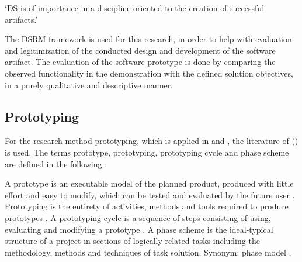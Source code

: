 \enquote*{DS is of importance in a discipline oriented to the creation of successful artifacts.}
\autocite{designScienceResearchMethodologyForInformationSystemsResearch}



The DSRM framework is used for this research,
in order to help with evaluation and legitimization
of the conducted design and development of the software artifact.
The evaluation of the software prototype is done by
comparing the observed functionality in the demonstration
with the defined solution objectives,
in a purely qualitative and descriptive manner.







\subsection{Prototyping}
\label{methodology:prototyping}

For the research method prototyping,
which is applied in
and
,
the literature of \citeauthor{riedlManagementInformatik2019} (\citeyear{riedlManagementInformatik2019}) is used.
The terms prototype, prototyping, prototyping cycle and phase scheme are defined in the following
\autocite{riedlManagementInformatik2019}:

A prototype is
an executable model of the planned product, produced with little effort and easy to modify,
which can be tested and evaluated by the future user
\autocite{riedlManagementInformatik2019}.
Prototyping
is the entirety of activities, methods and tools required to produce prototypes
\autocite{riedlManagementInformatik2019}.
A prototyping cycle is
a sequence of steps consisting of using, evaluating and modifying a prototype
\autocite{riedlManagementInformatik2019}.
A phase scheme is
the ideal-typical structure of a project in sections of logically related tasks including the methodology,
methods and techniques of task solution. Synonym: phase model
\autocite{riedlManagementInformatik2019}.



